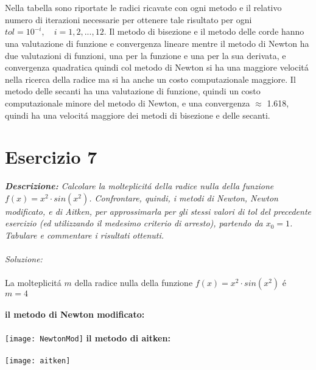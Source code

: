 \\~\\
Nella tabella sono riportate le radici ricavate con ogni metodo e il relativo numero di iterazioni necessarie per ottenere tale risultato per ogni $tol = 10^{-i}, \quad i=1, 2,...,12$.\newline
Il metodo di bisezione e il metodo delle corde hanno una valutazione di funzione e convergenza lineare mentre il metodo di Newton ha due valutazioni di funzioni, una per la funzione e una per la sua derivata, e convergenza quadratica quindi col metodo di Newton si ha una maggiore velocit\'a nella ricerca della radice ma si ha anche un costo computazionale maggiore. Il metodo delle secanti ha una valutazione di funzione, quindi un costo computazionale minore del metodo di Newton,  e una convergenza $\approx$ 1.618, quindi ha una velocit\'a maggiore dei metodi di bisezione e delle secanti.


\section{Esercizio 7}

\textit{\textbf{Descrizione:} Calcolare la molteplicit\'a della radice nulla della funzione $f(x) = x^{2} \cdot sin(x^{2})$. Confrontare, quindi, i metodi di Newton, Newton modificato, e di Aitken, per approssimarla per gli stessi valori di tol del precedente esercizio (ed utilizzando il medesimo criterio di arresto), partendo da $x_{0}=1$. Tabulare e commentare i risultati ottenuti.}\\~\\
\emph{Soluzione:}\\~\\
La molteplicit\'a $m$ della radice nulla della funzione $f(x) = x^{2} \cdot sin(x^{2})$  \'e $m=4$
\\~\\
\textbf{il metodo di Newton modificato:}
\\~\\
\texttt{[image: NewtonMod]}\newpage
\textbf{il metodo di aitken:}
\\~\\
\texttt{[image: aitken]}\newpage
{}